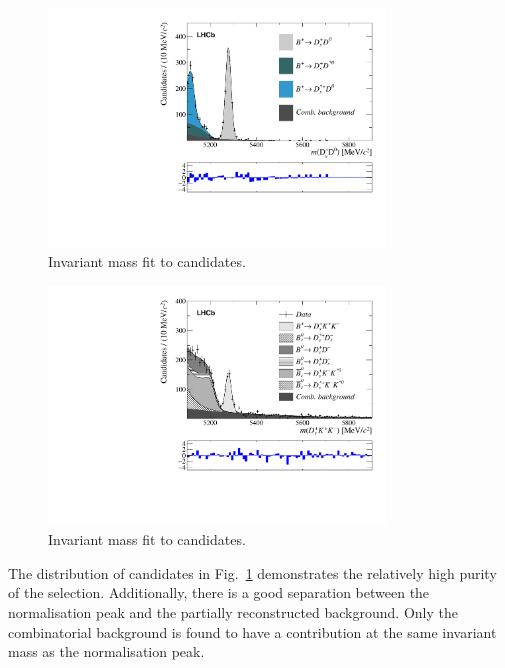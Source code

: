 \begin{figure}[!h]
    \centering
    \includegraphics[width=0.8\textwidth]{figs/B2DsKK/Fit_DsD0.pdf}
    \caption{Invariant mass fit to \decay{\Bp}{\Dsp\Dzb} candidates.}
    \label{fig:B2DsKK_fit_B2DsD0}   
\end{figure}
\begin{figure}[!h]
    \centering
    \includegraphics[width=0.8\textwidth]{figs/B2DsKK/Fit_DsKK.pdf}
    \caption{Invariant mass fit to \decay{\Bp}{\Dsp\Kp\Km} candidates.}
    \label{fig:B2DsKK_fit_B2DsKK}   
\end{figure}

The distribution of \decay{\Bp}{\Dsp\Dzb} candidates in Fig.~\ref{fig:B2DsKK_fit_B2DsD0} demonstrates the relatively high purity of the selection. Additionally, there is a good separation between the normalisation peak and the partially reconstructed background. Only the combinatorial background is found to have a contribution at the same invariant mass as the normalisation peak. 


